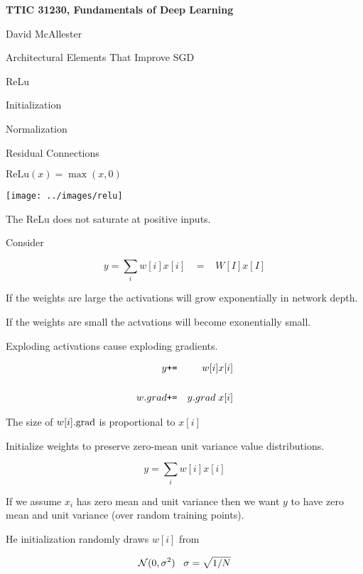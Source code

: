




{\Huge

  \centerline{\bf TTIC 31230, Fundamentals of Deep Learning}
  \bigskip
  \centerline{David McAllester}
  \vfill
  \centerline{Architectural Elements That Improve SGD}
  \vfill
  \vfill
  \centerline{ReLu}
  \vfill
  \centerline{Initialization}
  \vfill
  \centerline{Normalization}
  \vfill
  \centerline{Residual Connections}


$\mathrm{ReLu}(x) = \max(x,0)$

\vfill
\centerline{\texttt{[image: ../images/relu]}}

\vfill
The ReLu does not saturate at positive inputs.


Consider

\vfill
$$y = \sum_i w[i]x[i]  \;\;\;= \;\;\; W[I]x[I]$$

\vfill
If the weights are large the activations will grow exponentially in network depth.

\vfill
If the weights are small the actvations will become exonentially small.


Exploding activations cause exploding gradients.

\begin{eqnarray*}
y  & \mbox{\tt +=} & w[i]x[i] \\
\\
w.grad & \mbox{\tt +=} & y.grad \; x[i]
\end{eqnarray*}

\vfill
The size of $w[i].\mathrm{grad}$ is proportional to $x[i]$


Initialize weights to preserve zero-mean unit variance value distributions.

$$y = \sum_i w[i]x[i]$$

\vfill
If we assume $x_i$ has zero mean and unit variance then we want $y$
to have zero mean and unit variance (over random training points).

\vfill
He initialization randomly draws $w[i]$ from

$${\cal N}(0,\sigma^2)\;\;\;\sigma = \sqrt{1/N}$$

}
